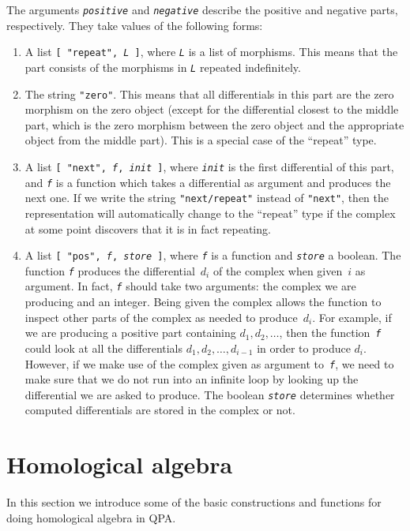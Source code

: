 \documentclass{amsart}
\theoremstyle{definition}
\newcommand{\code}[1]{\texttt{#1}}
\newcommand{\Arg}[1]{\texttt{\textit{#1}}}
\theoremstyle{theoretic}
\begin{document}
The arguments \Arg{positive} and \Arg{negative} describe the positive
and negative parts, respectively.  They take values of the following
forms:
\begin{enumerate}
\item A list \code{[ "repeat", \Arg{L} ]}, where \Arg{L} is a list of
morphisms.  This means that the part consists of the morphisms in
\Arg{L} repeated indefinitely.
\item The string \code{"zero"}.  This means that all differentials in
this part are the zero morphism on the zero object (except for the
differential closest to the middle part, which is the zero morphism
between the zero object and the appropriate object from the middle
part).  This is a special case of the ``repeat'' type.
\item A list \code{[ "next", \Arg{f}, \Arg{init} ]}, where \Arg{init}
is the first differential of this part, and \Arg{f} is a function
which takes a differential as argument and produces the next one.  If
we write the string \code{"next/repeat"} instead of \code{"next"},
then the representation will automatically change to the ``repeat''
type if the complex at some point discovers that it is in fact
repeating.
\item A list \code{[ "pos", \Arg{f}, \Arg{store} ]}, where \Arg{f} is
a function and \Arg{store} a boolean.  The function \Arg{f} produces
the differential~$d_i$ of the complex when given~$i$ as argument.  In
fact, \Arg{f} should take two arguments: the complex we are producing
and an integer.  Being given the complex allows the function to
inspect other parts of the complex as needed to produce~$d_i$.  For
example, if we are producing a positive part containing $d_1, d_2,
\ldots$, then the function~\Arg{f} could look at all the differentials
$d_1, d_2, \ldots, d_{i-1}$ in order to produce $d_i$.  However, if we
make use of the complex given as argument to~\Arg{f}, we need to make
sure that we do not run into an infinite loop by looking up the
differential we are asked to produce.  The boolean \Arg{store}
determines whether computed differentials are stored in the complex or
not.
\end{enumerate}

\section{Homological algebra}
In this section we introduce some of the basic constructions and
functions for doing homological algebra in QPA.  
\end{document}
